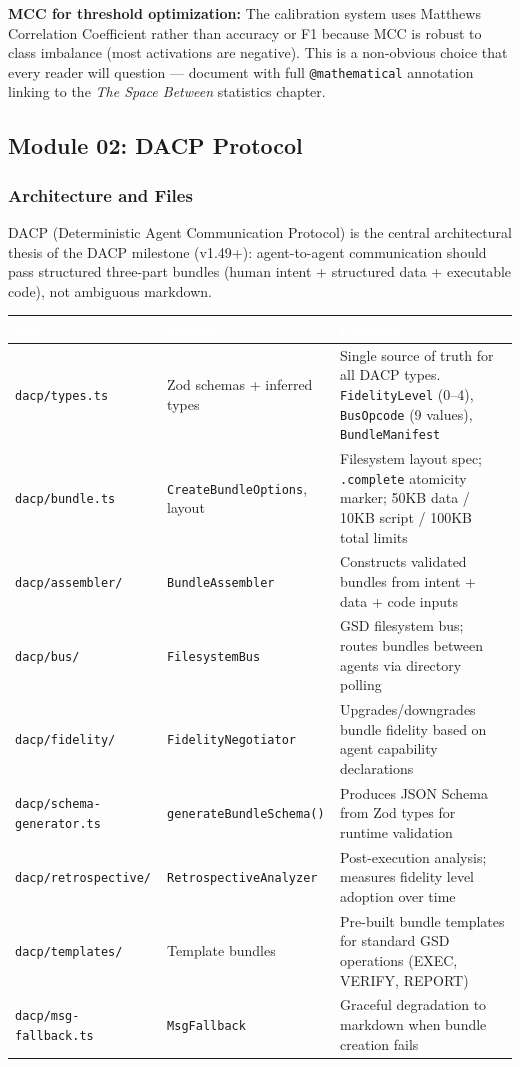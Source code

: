 \documentclass[11pt,letterpaper]{article}
\newcommand{\tableheader}[1]{\textbf{\sffamily\textcolor{white}{#1}}}
\begin{document}
\textbf{MCC for threshold optimization:} The calibration system uses Matthews Correlation Coefficient rather than accuracy or F1 because MCC is robust to class imbalance (most activations are negative). This is a non-obvious choice that every reader will question --- document with full \texttt{@mathematical} annotation linking to the \textit{The Space Between} statistics chapter.

\subsection{Module 02: DACP Protocol}

\subsubsection{Architecture and Files}

DACP (Deterministic Agent Communication Protocol) is the central architectural thesis of the DACP milestone (v1.49+): agent-to-agent communication should pass structured three-part bundles (human intent + structured data + executable code), not ambiguous markdown.

\begin{center}
\begin{tabularx}{\textwidth}{L{4.5cm}L{4cm}X}
\toprule
{}
\tableheader{File} & \tableheader{Export} & \tableheader{Purpose} \\
\midrule
\texttt{dacp/types.ts} & Zod schemas + inferred types & Single source of truth for all DACP types. \texttt{FidelityLevel} (0--4), \texttt{BusOpcode} (9 values), \texttt{BundleManifest} \\
\texttt{dacp/bundle.ts} & \texttt{CreateBundleOptions}, layout & Filesystem layout spec; \texttt{.complete} atomicity marker; 50KB data / 10KB script / 100KB total limits \\
\texttt{dacp/assembler/} & \texttt{BundleAssembler} & Constructs validated bundles from intent + data + code inputs \\
\texttt{dacp/bus/} & \texttt{FilesystemBus} & GSD filesystem bus; routes bundles between agents via directory polling \\
\texttt{dacp/fidelity/} & \texttt{FidelityNegotiator} & Upgrades/downgrades bundle fidelity based on agent capability declarations \\
\texttt{dacp/schema-generator.ts} & \texttt{generateBundleSchema()} & Produces JSON Schema from Zod types for runtime validation \\
\texttt{dacp/retrospective/} & \texttt{RetrospectiveAnalyzer} & Post-execution analysis; measures fidelity level adoption over time \\
\texttt{dacp/templates/} & Template bundles & Pre-built bundle templates for standard GSD operations (EXEC, VERIFY, REPORT) \\
\texttt{dacp/msg-fallback.ts} & \texttt{MsgFallback} & Graceful degradation to markdown when bundle creation fails \\
\bottomrule
\end{tabularx}
\end{center}
\end{document}
